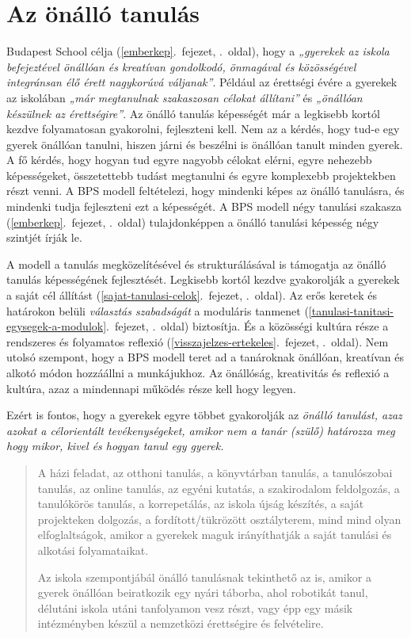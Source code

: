 \hypertarget{az-onallo-tanulas}{%
\section{Az önálló tanulás}\label{az-onallo-tanulas}}

Budapest School
célja (\ref{emberkep}.~fejezet, \pageref{emberkep}.~oldal), hogy a
\emph{„gyerekek az iskola befejeztével önállóan és kreatívan gondolkodó,
önmagával és közösségével integránsan élő érett nagykorúvá
váljanak''}. Például az érettségi évére a gyerekek az iskolában
\emph{„már megtanulnak szakaszosan célokat állítani''} és \emph{„önállóan
készülnek az érettségire''}. Az önálló tanulás képességét már a legkisebb
kortól kezdve folyamatosan gyakorolni, fejleszteni kell. Nem az a
kérdés, hogy tud-e egy gyerek önállóan tanulni, hiszen járni és beszélni
is önállóan tanult minden gyerek. A fő kérdés, hogy hogyan tud egyre
nagyobb célokat elérni, egyre nehezebb képességeket, összetettebb tudást
megtanulni és egyre komplexebb projektekben részt venni. A BPS modell
feltételezi, hogy mindenki képes az önálló tanulásra, és mindenki tudja
fejleszteni ezt a képességét. A BPS modell
négy tanulási szakasza (\ref{emberkep}.~fejezet, \pageref{emberkep}.~oldal)
tulajdonképpen a önálló tanulási képesség négy szintjét írják le.

A modell a tanulás megközelítésével és strukturálásával is támogatja az
önálló tanulás képességének fejlesztését. Legkisebb kortól kezdve
gyakorolják a gyerekek a
saját cél állítást (\ref{sajat-tanulasi-celok}.~fejezet, \pageref{sajat-tanulasi-celok}.~oldal).
Az erős keretek és határokon belüli \emph{választás szabadságát} a
moduláris tanmenet (\ref{tanulasi-tanitasi-egysegek-a-modulok}.~fejezet, \pageref{tanulasi-tanitasi-egysegek-a-modulok}.~oldal)
biztosítja. És a közösségi kultúra része a rendszeres és
folyamatos reflexió (\ref{visszajelzes-ertekeles}.~fejezet, \pageref{visszajelzes-ertekeles}.~oldal).
Nem utolsó szempont, hogy a BPS modell teret ad a tanároknak önállóan,
kreatívan és alkotó módon hozzáállni a munkájukhoz. Az önállóság,
kreativitás és reflexió a kultúra, azaz a mindennapi működés része kell
hogy legyen.

Ezért is fontos, hogy a gyerekek egyre többet gyakorolják az
\emph{önálló tanulást, azaz azokat a célorientált tevékenységeket,
amikor nem a tanár (szülő) határozza meg hogy mikor, kivel és hogyan
tanul egy gyerek.}

\begin{quote}
A házi feladat, az otthoni tanulás, a könyvtárban tanulás, a
tanulószobai tanulás, az online tanulás, az egyéni kutatás, a
szakirodalom feldolgozás, a tanulókörös tanulás, a korrepetálás, az
iskola újság készítés, a saját projekteken dolgozás, a
fordított/tükrözött osztályterem, mind mind olyan elfoglaltságok, amikor
a gyerekek maguk irányíthatják a saját tanulási és alkotási
folyamataikat.

Az iskola szempontjábál önálló tanulásnak tekinthető az is, amikor a
gyerek önállóan beiratkozik egy nyári táborba, ahol robotikát tanul,
délutáni iskola utáni tanfolyamon vesz részt, vagy épp egy másik
intézményben készül a nemzetközi érettségire és felvételire.
\end{quote}

